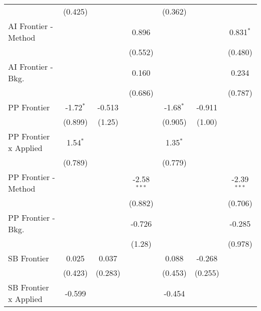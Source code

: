 \begin{tabular}{lcccccc}
                                & (0.425)        &               &               & (0.362)        &               &   \\   
   AI Frontier - Method         &                &               & 0.896         &                &               & 0.831$^{*}$\\   
                                &                &               & (0.552)       &                &               & (0.480)\\   
   AI Frontier - Bkg.           &                &               & 0.160         &                &               & 0.234\\   
                                &                &               & (0.686)       &                &               & (0.787)\\   
   PP Frontier                  & -1.72$^{*}$    & -0.513        &               & -1.68$^{*}$    & -0.911        &   \\   
                                & (0.899)        & (1.25)        &               & (0.905)        & (1.00)        &   \\   
   PP Frontier x Applied        & 1.54$^{*}$     &               &               & 1.35$^{*}$     &               &   \\   
                                & (0.789)        &               &               & (0.779)        &               &   \\   
   PP Frontier - Method         &                &               & -2.58$^{***}$ &                &               & -2.39$^{***}$\\   
                                &                &               & (0.882)       &                &               & (0.706)\\   
   PP Frontier - Bkg.           &                &               & -0.726        &                &               & -0.285\\   
                                &                &               & (1.28)        &                &               & (0.978)\\   
   SB Frontier                  & 0.025          & 0.037         &               & 0.088          & -0.268        &   \\   
                                & (0.423)        & (0.283)       &               & (0.453)        & (0.255)       &   \\   
   SB Frontier x Applied        & -0.599         &               &               & -0.454         &               &   \\   

\end{tabular}
